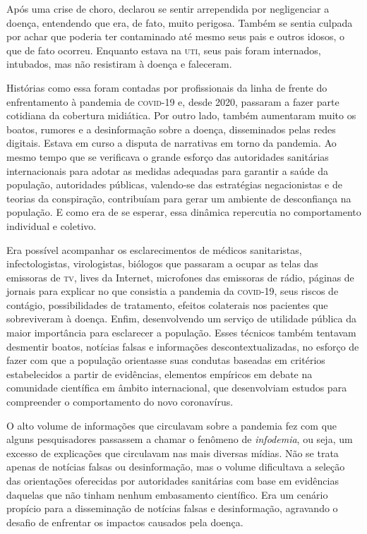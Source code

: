 Após uma crise de choro, declarou se sentir arrependida por negligenciar
a doença, entendendo que era, de fato, muito perigosa. Também se sentia
culpada por achar que poderia ter contaminado até mesmo seus pais e
outros idosos, o que de fato ocorreu. Enquanto estava na \textsc{uti}, seus pais
foram internados, intubados, mas não resistiram à doença e faleceram.

Histórias como essa foram contadas por profissionais da linha de frente
do enfrentamento à pandemia de \textsc{covid-19} e, desde 2020, passaram a fazer
parte cotidiana da cobertura midiática. Por outro lado, também
aumentaram muito os boatos, rumores e a desinformação sobre a doença,
disseminados pelas redes digitais. Estava em curso a disputa de
narrativas em torno da pandemia. Ao mesmo tempo que se verificava o
grande esforço das autoridades sanitárias internacionais para adotar as
medidas adequadas para garantir a saúde da população, autoridades
públicas, valendo-se das estratégias negacionistas e de teorias da
conspiração, contribuíam para gerar um ambiente de desconfiança na
população. E como era de se esperar, essa dinâmica repercutia no
comportamento individual e coletivo.

Era possível acompanhar os esclarecimentos de médicos sanitaristas,
infectologistas, virologistas, biólogos que passaram a ocupar as telas
das emissoras de \textsc{tv}, lives da Internet, microfones das emissoras de
rádio, páginas de jornais para explicar no que consistia a pandemia da
\textsc{covid-19}, seus riscos de contágio, possibilidades de tratamento, efeitos
colaterais nos pacientes que sobreviveram à doença. Enfim, desenvolvendo
um serviço de utilidade pública da maior importância para esclarecer a
população. Esses técnicos também tentavam desmentir boatos, notícias
falsas e informações descontextualizadas, no esforço de fazer com que a
população orientasse suas condutas baseadas em critérios estabelecidos a
partir de evidências, elementos empíricos em debate na comunidade
científica em âmbito internacional, que desenvolviam estudos para
compreender o comportamento do novo coronavírus.

O alto volume de informações que circulavam sobre a pandemia fez com que
alguns pesquisadores passassem a chamar o fenômeno de \textit{infodemia}, ou
seja, um excesso de explicações que circulavam nas mais diversas mídias.
Não se trata apenas de notícias falsas ou desinformação, mas o volume
dificultava a seleção das orientações oferecidas por autoridades
sanitárias com base em evidências daquelas que não tinham nenhum
embasamento científico. Era um cenário propício para a disseminação de
notícias falsas e desinformação, agravando o desafio de enfrentar os
impactos causados pela doença.

